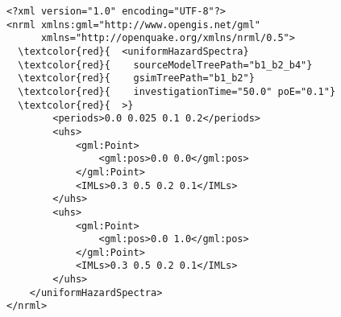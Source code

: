 \begin{Verbatim}[frame=single, commandchars=\\\{\}, fontsize=\small]
<?xml version="1.0" encoding="UTF-8"?>
<nrml xmlns:gml="http://www.opengis.net/gml"
      xmlns="http://openquake.org/xmlns/nrml/0.5">
  \textcolor{red}{  <uniformHazardSpectra}
  \textcolor{red}{    sourceModelTreePath="b1_b2_b4"}
  \textcolor{red}{    gsimTreePath="b1_b2"}
  \textcolor{red}{    investigationTime="50.0" poE="0.1"}
  \textcolor{red}{  >}
        <periods>0.0 0.025 0.1 0.2</periods>
        <uhs>
            <gml:Point>
                <gml:pos>0.0 0.0</gml:pos>
            </gml:Point>
            <IMLs>0.3 0.5 0.2 0.1</IMLs>
        </uhs>
        <uhs>
            <gml:Point>
                <gml:pos>0.0 1.0</gml:pos>
            </gml:Point>
            <IMLs>0.3 0.5 0.2 0.1</IMLs>
        </uhs>
    </uniformHazardSpectra>
</nrml>
\end{Verbatim}